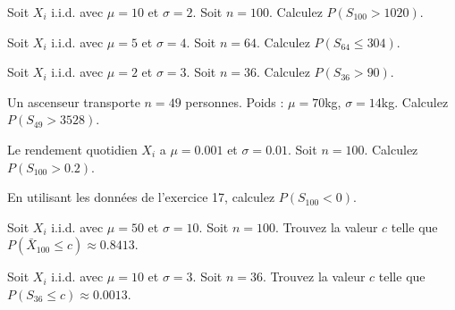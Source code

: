 
\begin{exercicebox}
Soit $X_i$ i.i.d. avec $\mu=10$ et $\sigma=2$. Soit $n=100$.
Calculez $P(S_{100} > 1020)$.
\end{exercicebox}

\begin{exercicebox}
Soit $X_i$ i.i.d. avec $\mu=5$ et $\sigma=4$. Soit $n=64$.
Calculez $P(S_{64} \le 304)$.
\end{exercicebox}

\begin{exercicebox}
Soit $X_i$ i.i.d. avec $\mu=2$ et $\sigma=3$. Soit $n=36$.
Calculez $P(S_{36} > 90)$.
\end{exercicebox}

\begin{exercicebox}
Un ascenseur transporte $n=49$ personnes. Poids : $\mu=70$kg, $\sigma=14$kg.
Calculez $P(S_{49} > 3528)$.
\end{exercicebox}

\begin{exercicebox}
Le rendement quotidien $X_i$ a $\mu=0.001$ et $\sigma=0.01$. Soit $n=100$.
Calculez $P(S_{100} > 0.2)$.
\end{exercicebox}

\begin{exercicebox}
En utilisant les données de l'exercice 17, calculez $P(S_{100} < 0)$.
\end{exercicebox}


\begin{exercicebox}
Soit $X_i$ i.i.d. avec $\mu=50$ et $\sigma=10$. Soit $n=100$.
Trouvez la valeur $c$ telle que $P(\bar{X}_{100} \le c) \approx 0.8413$.
\end{exercicebox}

\begin{exercicebox}
Soit $X_i$ i.i.d. avec $\mu=10$ et $\sigma=3$. Soit $n=36$.
Trouvez la valeur $c$ telle que $P(S_{36} \le c) \approx 0.0013$.
\end{exercicebox}

